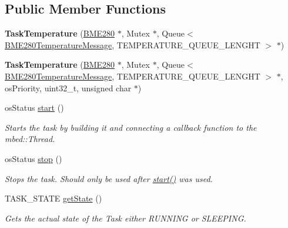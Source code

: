 \subsection*{Public Member Functions}
\begin{DoxyCompactItemize}
\item 
\hypertarget{class_task_temperature_a77f8397025d30bd3733b342a0391d1a2}{}{\bfseries Task\+Temperature} (\hyperlink{class_b_m_e280}{B\+M\+E280} $\ast$, Mutex $\ast$, Queue$<$ \hyperlink{class_b_m_e280_temperature_message}{B\+M\+E280\+Temperature\+Message}, T\+E\+M\+P\+E\+R\+A\+T\+U\+R\+E\+\_\+\+Q\+U\+E\+U\+E\+\_\+\+L\+E\+N\+G\+H\+T $>$ $\ast$)\label{class_task_temperature_a77f8397025d30bd3733b342a0391d1a2}

\item 
\hypertarget{class_task_temperature_af7207d45514620c96b9d68cc1110560a}{}{\bfseries Task\+Temperature} (\hyperlink{class_b_m_e280}{B\+M\+E280} $\ast$, Mutex $\ast$, Queue$<$ \hyperlink{class_b_m_e280_temperature_message}{B\+M\+E280\+Temperature\+Message}, T\+E\+M\+P\+E\+R\+A\+T\+U\+R\+E\+\_\+\+Q\+U\+E\+U\+E\+\_\+\+L\+E\+N\+G\+H\+T $>$ $\ast$, os\+Priority, uint32\+\_\+t, unsigned char $\ast$)\label{class_task_temperature_af7207d45514620c96b9d68cc1110560a}

\item 
os\+Status \hyperlink{class_task_temperature_ada8c9d103caa02964b57fcf61d7baca5}{start} ()
\begin{DoxyCompactList}\small\item\em Starts the task by building it and connecting a callback function to the mbed\+::\+Thread. \end{DoxyCompactList}\item 
os\+Status \hyperlink{class_task_temperature_a636df181e9c97eaa84c93139393334f2}{stop} ()
\begin{DoxyCompactList}\small\item\em Stops the task. Should only be used after \hyperlink{class_task_temperature_ada8c9d103caa02964b57fcf61d7baca5}{start()} was used. \end{DoxyCompactList}\item 
T\+A\+S\+K\+\_\+\+S\+T\+A\+T\+E \hyperlink{class_task_temperature_a0a0f3454e5be903d0c316d4153f8220f}{get\+State} ()
\begin{DoxyCompactList}\small\item\em Gets the actual state of the Task either R\+U\+N\+N\+I\+N\+G or S\+L\+E\+E\+P\+I\+N\+G. \end{DoxyCompactList}\end{DoxyCompactItemize}


